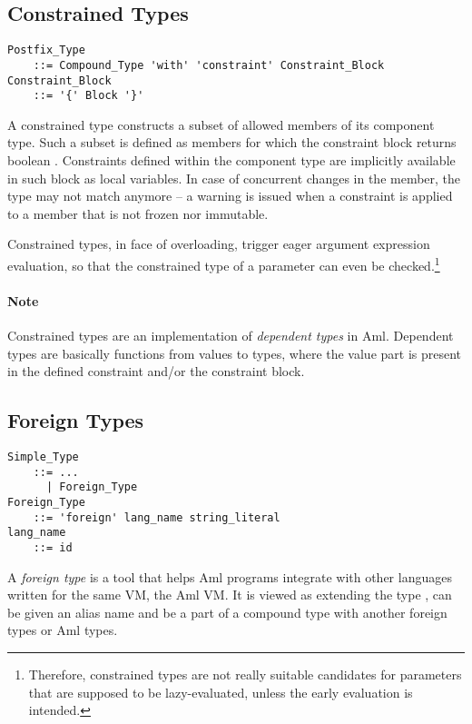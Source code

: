 \subsection{Constrained Types}
\label{sec:constrained-types}

\grammar\begin{lstlisting}
Postfix_Type 
    ::= Compound_Type 'with' 'constraint' Constraint_Block
Constraint_Block 
    ::= '{' Block '}'
\end{lstlisting}

A constrained type constructs a subset of allowed members of its component type. Such a subset is defined as members for which the constraint block returns boolean . Constraints defined within the component type are implicitly available in such block as local variables. In case of concurrent changes in the member, the type may not match anymore -- a warning is issued when a constraint is applied to a member that is not frozen nor immutable. 

Constrained types, in face of overloading, trigger eager argument expression evaluation, so that the constrained type of a parameter can even be checked.\footnote{Therefore, constrained types are not really suitable candidates for parameters that are supposed to be lazy-evaluated, unless the early evaluation is intended.}

\paragraph{Note}
Constrained types are an implementation of {\em dependent types} in Aml. Dependent types are basically functions from values to types, where the value part is present in the defined constraint and/or the constraint block. 





\subsection{Foreign Types}
\label{sec:foreign-types}

\grammar\begin{lstlisting}
Simple_Type 
    ::= ...
      | Foreign_Type
Foreign_Type 
    ::= 'foreign' lang_name string_literal
lang_name 
    ::= id
\end{lstlisting}

A {\em foreign type} is a tool that helps Aml programs integrate with other languages written for the same VM, the Aml VM. It is viewed as extending the type , can be given an alias name and be a part of a compound type with another foreign types or Aml types. 

